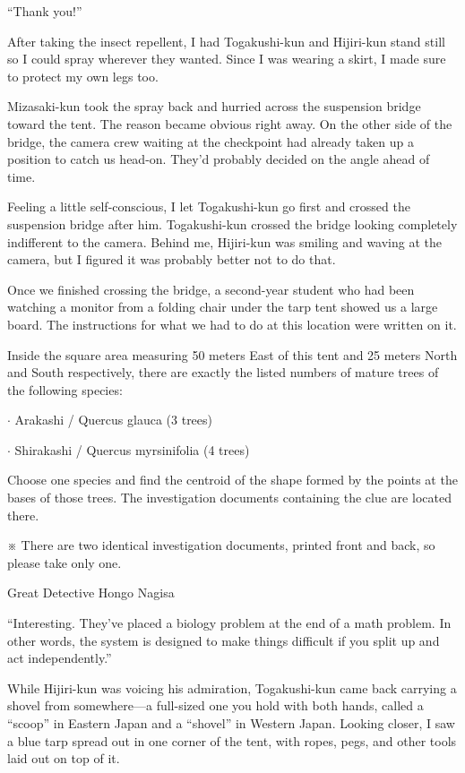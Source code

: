\documentclass[
    a4paper,
    12pt,
    twoside,
    openany,
    UTF8,
    fontset=windows
]{ctexbook}
\begin{document}
``Thank you!''

After taking the insect repellent, I had Togakushi-kun and Hijiri-kun stand still so I could spray wherever they wanted. Since I was wearing a skirt, I made sure to protect my own legs too.

Mizasaki-kun took the spray back and hurried across the suspension bridge toward the tent. The reason became obvious right away. On the other side of the bridge, the camera crew waiting at the checkpoint had already taken up a position to catch us head-on. They'd probably decided on the angle ahead of time.

Feeling a little self-conscious, I let Togakushi-kun go first and crossed the suspension bridge after him. Togakushi-kun crossed the bridge looking completely indifferent to the camera. Behind me, Hijiri-kun was smiling and waving at the camera, but I figured it was probably better not to do that.

Once we finished crossing the bridge, a second-year student who had been watching a monitor from a folding chair under the tarp tent showed us a large board. The instructions for what we had to do at this location were written on it.

Inside the square area measuring 50 meters East of this tent and 25 meters North and South respectively, there are exactly the listed numbers of mature trees of the following species:


$\cdot$ Arakashi / Quercus glauca (3 trees)

$\cdot$ Shirakashi / Quercus myrsinifolia (4 trees)

Choose one species and find the centroid of the shape formed by the points at the bases of those trees. The investigation documents containing the clue are located there.

※ There are two identical investigation documents, printed front and back, so please take only one.

Great Detective Hongo Nagisa

``Interesting. They've placed a biology problem at the end of a math problem. In other words, the system is designed to make things difficult if you split up and act independently.''

While Hijiri-kun was voicing his admiration, Togakushi-kun came back carrying a shovel from somewhere---a full-sized one you hold with both hands, called a ``scoop'' in Eastern Japan and a ``shovel'' in Western Japan. Looking closer, I saw a blue tarp spread out in one corner of the tent, with ropes, pegs, and other tools laid out on top of it.
\end{document}
